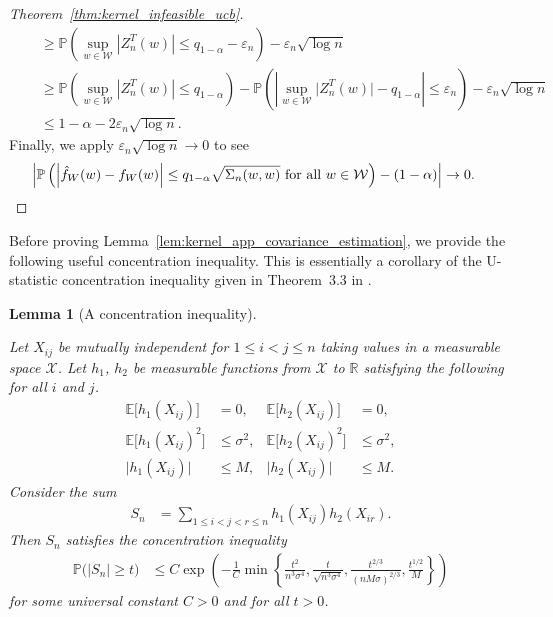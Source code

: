 \documentclass[11pt,lof]{puthesis}
\renewcommand{\P}{\ensuremath{\mathbb{P}}}
\newcommand{\R}{\ensuremath{\mathbb{R}}}
\newcommand{\E}{\ensuremath{\mathbb{E}}}
\newcommand{\cX}{\ensuremath{\mathcal{X}}}
\newcommand{\cW}{\ensuremath{\mathcal{W}}}
\theoremstyle{break}
\newtheorem{lemma}{Lemma}[section]
\theoremstyle{proof}
\newtheorem{proof}{Proof}
\begin{document}
\begin{proof}[Theorem~\ref{thm:kernel_infeasible_ucb}]
\begin{align*}
    &\quad\geq
    \P\left(
      \sup_{w \in \cW}
      \left| Z_n^T(w) \right|
      \leq
      q_{1-\alpha}
      - \varepsilon_n
    \right)
    - \varepsilon_n \sqrt{\log n} \\
    &\quad\geq
    \P\left(
      \sup_{w \in \cW}
      \left|
      Z_n^T(w)
      \right|
      \leq
      q_{1-\alpha}
    \right)
    - \P\left(
      \left|
      \sup_{w \in \cW}
      \big| Z_n^T(w) \big|
      - q_{1-\alpha}
      \right|
      \leq \varepsilon_n
    \right)
    - \varepsilon_n \sqrt{\log n} \\
    &\quad\leq
    1 - \alpha
    - 2 \varepsilon_n \sqrt{\log n}.
  \end{align*}
  Finally, we apply $\varepsilon_n \sqrt{\log n} \to 0$
  to see
  \begin{align*}
    \left|
    \P\left(
      \left|
      \hat f_W(w) - f_W(w)
      \right|
      \leq
      q_{1-\alpha}
      \sqrt{\Sigma_n(w,w)}
      \textup{ for all }
      w \in \cW
    \right)
    - (1 - \alpha)
    \right|
    &\to 0.
  \end{align*}
\end{proof}

Before proving
Lemma~\ref{lem:kernel_app_covariance_estimation},
we provide the following useful
concentration inequality.
This is essentially a corollary of the
U-statistic concentration inequality given in
Theorem~3.3 in \citet{gine2000exponential}.

\begin{lemma}[A concentration inequality]
  \label{lem:kernel_app_dyadic_concentration}

  Let $X_{i j}$ be mutually independent for $1 \leq i < j \leq n$
  taking values in a measurable space $\cX$.
  Let $h_1$, $h_2$ be measurable functions from $\cX$ to $\R$
  satisfying the following for all $i$ and $j$.
  \begin{align*}
    \E\big[h_1(X_{i j})\big]
    &= 0,
    &\E\big[h_2(X_{i j})\big]
    &=0, \\
    \E\big[h_1(X_{i j})^2\big]
    &\leq \sigma^2,
    &\E\big[h_2(X_{i j})^2\big]
    &\leq \sigma^2, \\
    \big|h_1(X_{i j})\big|
    &\leq M,
    &\big|h_2(X_{i j})\big|
    &\leq M.
  \end{align*}
  Consider the sum
  \begin{align*}
    S_n
    &=
    \sum_{1 \leq i < j < r \leq n}
    h_1(X_{i j})
    h_2(X_{i r}).
  \end{align*}
  Then $S_n$ satisfies the concentration inequality
  \begin{align*}
    \P\big(
      |S_n| \geq t
    \big)
    &\leq
    C \exp\left(
      -\frac{1}{C}
      \min \left\{
        \frac{t^2}{n^3 \sigma^4},
        \frac{t}{\sqrt{n^3 \sigma^4}},
        \frac{t^{2/3}}{(n M \sigma)^{2/3}},
        \frac{t^{1/2}}{M}
      \right\}
    \right)
  \end{align*}
  for some universal constant
  $C > 0$
  and for all $t>0$.

\end{lemma}
\end{document}
